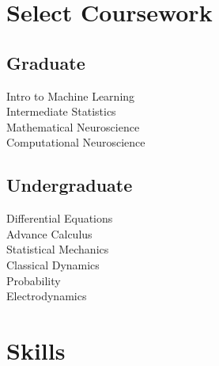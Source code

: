 \documentclass[]{deedy-resume-openfont}
\begin{document}
\begin{minipage}[t]{0.33\textwidth}


\section{Select Coursework}
\subsection{Graduate}
Intro to Machine Learning \\
Intermediate Statistics \\
Mathematical Neuroscience\\
Computational Neuroscience\\
\sectionsep

\subsection{Undergraduate}
 Differential Equations\\
 Advance Calculus \\
 Statistical Mechanics\\
 Classical Dynamics\\
 Probability\\
 Electrodynamics\\
 

\sectionsep


\section{Skills}

\end{minipage}
\end{document}
